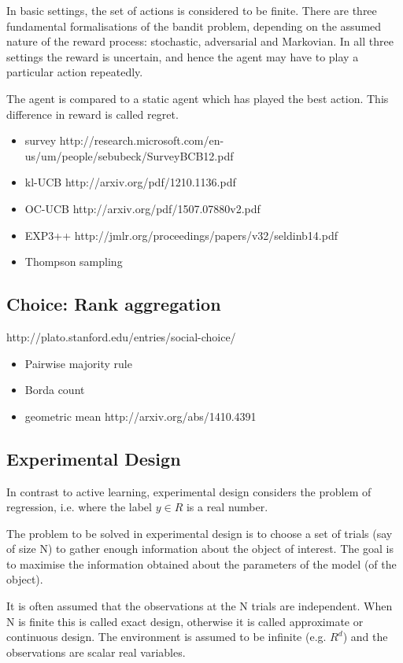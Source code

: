 \documentclass[fleqn,10pt,lineno]{wlpeerj} %
\begin{document}
In basic settings, the set of actions is considered to be
finite. There are three fundamental formalisations of the bandit
problem, depending on the assumed nature of the reward process:
stochastic, adversarial and Markovian. In all three settings the
reward is uncertain, and hence the agent may have to play a particular
action repeatedly.

The agent is compared to a static agent which has played the best
action. This difference in reward is called regret.

\begin{itemize}
  \item survey http://research.microsoft.com/en-us/um/people/sebubeck/SurveyBCB12.pdf
  \item kl-UCB http://arxiv.org/pdf/1210.1136.pdf
  \item OC-UCB http://arxiv.org/pdf/1507.07880v2.pdf
  \item EXP3++ http://jmlr.org/proceedings/papers/v32/seldinb14.pdf
  \item Thompson sampling
\end{itemize}

\subsection*{Choice: Rank aggregation}

http://plato.stanford.edu/entries/social-choice/

\begin{itemize}
  \item Pairwise majority rule
  \item Borda count
  \item geometric mean http://arxiv.org/abs/1410.4391
\end{itemize}


\subsection*{Experimental Design}

In contrast to active learning, experimental design considers the problem of regression, i.e. where the label $y\in R$ is a real number.

The problem to be solved in experimental design is to choose a set of
trials (say of size N) to gather enough information about the object
of interest. The goal is to maximise the information obtained about
the parameters of the model (of the object).

It is often assumed that the observations at the N trials are
independent. When N is finite this is called exact design, otherwise
it is called approximate or continuous design. The environment is
assumed to be infinite (e.g. $R^d$) and the observations are scalar real variables.
\end{document}
